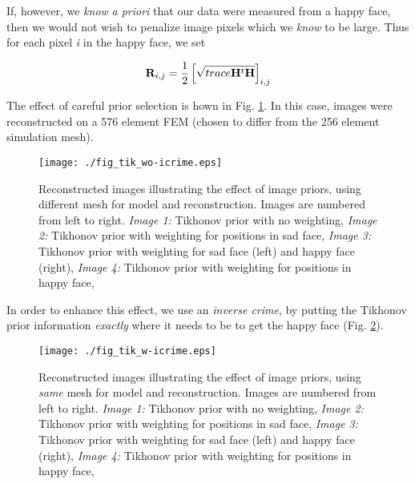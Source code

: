 \documentclass[12pt]{iopart}
\begin{document}
If, however, we {\em know} {\em a priori} that 
our data were measured from a happy face, then we 
would not wish to penalize image pixels which we
{\em know} to be large. Thus for each pixel {\em i}
in the happy face, we set 

\begin{equation}
   {\bf R}_{i,j} = \frac{1}{2} \left[
              \sqrt{ trace {\bf H}^t{\bf H} }
                               \right]_{i,j}
\end{equation}

The effect of careful prior selection is hown in
Fig. \ref{fig:tikprior}.
In this case, images were reconstructed on a 576 element
FEM (chosen to differ from the 256 element simulation mesh).


%
%
\begin{figure}[th]
\begin{flushright}
\texttt{[image: ./fig\_tik\_wo-icrime.eps]}
\caption{\small 
Reconstructed images illustrating the effect of image priors,
using different mesh for model and reconstruction.
Images are numbered from left to right.
{\em Image 1:} Tikhonov prior with no weighting,
{\em Image 2:} Tikhonov prior with weighting for positions in sad face,
{\em Image 3:} Tikhonov prior with weighting for sad face (left) and
happy face (right),
{\em Image 4:} Tikhonov prior with weighting for positions in happy face,
 }
 \label{fig:tikprior}
\end{flushright}
\end{figure}

In order to enhance this effect, we use an {\em inverse crime},
by putting the Tikhonov prior information {\em exactly} where
it needs to be to get the happy face (Fig. \ref{fig:tikprior_icrime}).

%
%
\begin{figure}[th]
\begin{flushright}
\texttt{[image: ./fig\_tik\_w-icrime.eps]}
\caption{\small 
Reconstructed images illustrating the effect of image priors,
using {\em same} mesh for model and reconstruction.
Images are numbered from left to right.
{\em Image 1:} Tikhonov prior with no weighting,
{\em Image 2:} Tikhonov prior with weighting for positions in sad face,
{\em Image 3:} Tikhonov prior with weighting for sad face (left) and
happy face (right),
{\em Image 4:} Tikhonov prior with weighting for positions in happy face,
 }
 \label{fig:tikprior_icrime}
\end{flushright}
\end{figure}
\end{document}
